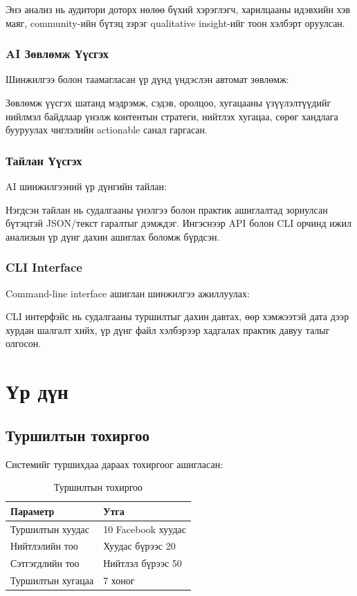 \documentclass[12pt,a4paper]{report}
\begin{document}
Энэ анализ нь аудитори доторх нөлөө бүхий хэрэглэгч, харилцааны идэвхийн хэв маяг, community-ийн бүтэц зэрэг qualitative insight-ийг тоон хэлбэрт оруулсан.


\subsection{AI Зөвлөмж Үүсгэх}

Шинжилгээ болон таамагласан үр дүнд үндэслэн автомат зөвлөмж:

Зөвлөмж үүсгэх шатанд мэдрэмж, сэдэв, оролцоо, хугацааны үзүүлэлтүүдийг нийлмэл байдлаар үнэлж контентын стратеги, нийтлэх хугацаа, сөрөг хандлага бууруулах чиглэлийн actionable санал гаргасан.


\subsection{Тайлан Үүсгэх}

AI шинжилгээний үр дүнгийн тайлан:

Нэгдсэн тайлан нь судалгааны үнэлгээ болон практик ашиглалтад зориулсан бүтэцтэй JSON/текст гаралтыг дэмждэг. Ингэснээр API болон CLI орчинд ижил анализын үр дүнг дахин ашиглах боломж бүрдсэн.


\subsection{CLI Interface}

Command-line interface ашиглан шинжилгээ ажиллуулах:

CLI интерфэйс нь судалгааны туршилтыг дахин давтах, өөр хэмжээтэй дата дээр хурдан шалгалт хийх, үр дүнг файл хэлбэрээр хадгалах практик давуу талыг олгосон.


\chapter{Үр дүн}

\section{Туршилтын тохиргоо}

Системийг туршихдаа дараах тохиргоог ашигласан:

\begin{table}[H]
\centering
\caption{Туршилтын тохиргоо}
\begin{tabular}{|l|l|}
\hline
\textbf{Параметр} & \textbf{Утга} \\
\hline
Туршилтын хуудас & 10 Facebook хуудас \\
Нийтлэлийн тоо & Хуудас бүрээс 20 \\
Сэтгэгдлийн тоо & Нийтлэл бүрээс 50 \\
Туршилтын хугацаа & 7 хоног \\
\hline
\end{tabular}
\end{table}
\end{document}
